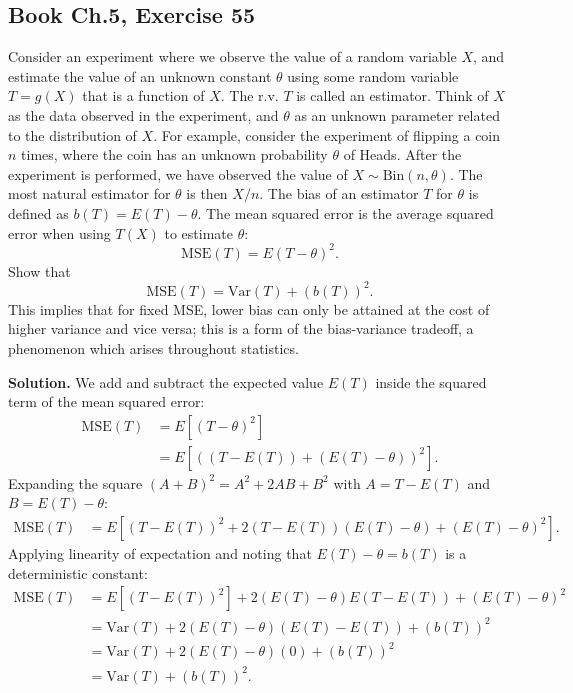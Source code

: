 \documentclass[11pt,a4paper]{article}
\begin{document}
\subsection{Book Ch.5, Exercise 55}
\begin{tcolorbox}[title={Book Ch.5, Exercise 55}]
Consider an experiment where we observe the value of a random variable $X$, and estimate the value of an unknown constant $\theta$ using some random variable $T = g(X)$ that is a function of $X$. The r.v. $T$ is called an estimator. Think of $X$ as the data observed in the experiment, and $\theta$ as an unknown parameter related to the distribution of $X$. For example, consider the experiment of flipping a coin $n$ times, where the coin has an unknown probability $\theta$ of Heads. After the experiment is performed, we have observed the value of $X \sim \text{Bin}(n, \theta)$. The most natural estimator for $\theta$ is then $X/n$.
The bias of an estimator $T$ for $\theta$ is defined as $b(T) = E(T) - \theta$. The mean squared error is the average squared error when using $T(X)$ to estimate $\theta$:
\[
\text{MSE}(T) = E(T - \theta)^2.
\]
Show that
\[
\text{MSE}(T) = \text{Var}(T) + (b(T))^2.
\]
This implies that for fixed MSE, lower bias can only be attained at the cost of higher variance and vice versa; this is a form of the bias-variance tradeoff, a phenomenon which arises throughout statistics.
\end{tcolorbox}

\noindent \textbf{Solution.} We add and subtract the expected value $E(T)$ inside the squared term of the mean squared error:
\begin{align*}
\text{MSE}(T) &= E\left[ (T - \theta)^2 \right] \\
&= E\left[ \left( (T - E(T)) + (E(T) - \theta) \right)^2 \right].
\end{align*}
Expanding the square $(A + B)^2 = A^2 + 2AB + B^2$ with $A = T - E(T)$ and $B = E(T) - \theta$:
\begin{align*}
\text{MSE}(T) &= E\left[ (T - E(T))^2 + 2(T - E(T))(E(T) - \theta) + (E(T) - \theta)^2 \right].
\end{align*}
Applying linearity of expectation and noting that $E(T) - \theta = b(T)$ is a deterministic constant:
\begin{align*}
\text{MSE}(T) &= E\left[ (T - E(T))^2 \right] + 2(E(T) - \theta) E(T - E(T)) + (E(T) - \theta)^2 \\
&= \text{Var}(T) + 2(E(T) - \theta)(E(T) - E(T)) + (b(T))^2 \\
&= \text{Var}(T) + 2(E(T) - \theta)(0) + (b(T))^2 \\
&= \text{Var}(T) + (b(T))^2.
\end{align*}
\end{document}
